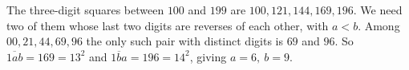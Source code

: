 The three-digit squares between $100$ and $199$ are $100,121,144,169,196$. We need two of them whose last two digits are reverses of each other, with $a<b$. Among $00,21,44,69,96$ the only such pair with distinct digits is $69$ and $96$. So $\overline{1ab}=169=13^2$ and $\overline{1ba}=196=14^2$, giving $\boxed{a=6,\ b=9}$.
